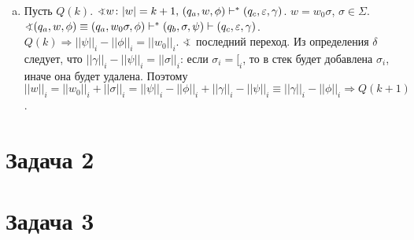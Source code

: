 \documentclass[a4paper]{article}
\begin{document}
\begin{enumerate}
\begin{enumerate}[a.]
\item Пусть $Q(k)$. $\varangle w\colon |w|=k+1,\,(q_a,w,\phi)\vdash^*(q_c,\varepsilon,\gamma)$. $w=w_0\sigma$, $\sigma\in\Sigma$. $\varangle (q_a,w,\phi)\equiv(q_a,w_0\sigma,\phi)\vdash^*(q_b,\sigma,\psi)\vdash(q_c,\varepsilon,\gamma)$. $Q(k)\Rightarrow ||\psi||_i-||\phi||_i=||w_0||_i$. $\varangle$ последний переход. Из определения $\delta$ следует, что $||\gamma||_i-||\psi||_i=||\sigma||_i$: если $\sigma_i=[_i$, то в стек будет добавлена $\sigma_i$, иначе она будет удалена. Поэтому $||w||_i=||w_0||_i+||\sigma||_i=||\psi||_i-||\phi||_i+||\gamma||_i-||\psi||_i\equiv||\gamma||_i-||\phi||_i\Rightarrow Q(k+1)$.
\end{enumerate}
\end{enumerate}
\section*{Задача 2}
\section*{Задача 3}
\end{document}
